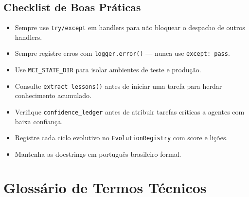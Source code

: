 \subsection{Checklist de Boas Práticas}

\begin{itemize}
    \item[\checkmark] Sempre use \texttt{try/except} em handlers para não bloquear o despacho de outros handlers.
    \item[\checkmark] Sempre registre erros com \texttt{logger.error()} — nunca use \texttt{except: pass}.
    \item[\checkmark] Use \texttt{MCI\_STATE\_DIR} para isolar ambientes de teste e produção.
    \item[\checkmark] Consulte \texttt{extract\_lessons()} antes de iniciar uma tarefa para herdar conhecimento acumulado.
    \item[\checkmark] Verifique \texttt{confidence\_ledger} antes de atribuir tarefas críticas a agentes com baixa confiança.
    \item[\checkmark] Registre cada ciclo evolutivo no \texttt{EvolutionRegistry} com score e lições.
    \item[\checkmark] Mantenha as docstrings em português brasileiro formal.
\end{itemize}

\section{Glossário de Termos Técnicos}
\label{sec:glossary}

